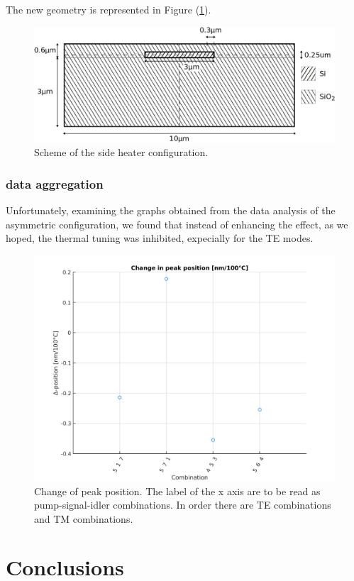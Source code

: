 \documentclass[12pt,a4paper,twoside]{article}
\begin{document}
The new geometry is represented in Figure (\ref{fig_geometry_asym}).
\begin{figure}[!ht]
	\centering
	\includegraphics[width=.9\textwidth]{geometryA.png}
	\caption{Scheme of the side heater configuration.}
	\label{fig_geometry_asym}
\end{figure}

\subsubsection{data aggregation}
Unfortunately, examining the graphs obtained from the data analysis of the asymmetric configuration, we found that instead of enhancing the effect, as we hoped, the thermal tuning was inhibited, expecially for the TE modes.

\begin{figure}[!hb]
	\centering
	\includegraphics[width=.75\textwidth]{asym_ppc2.png}
	\caption{Change of peak position. The label of the x axis are to be read as pump-signal-idler combinations. In order there are TE combinations and TM combinations.}
	\label{fig_asym_ppc2} %
\end{figure}

\section{Conclusions}
\end{document}
